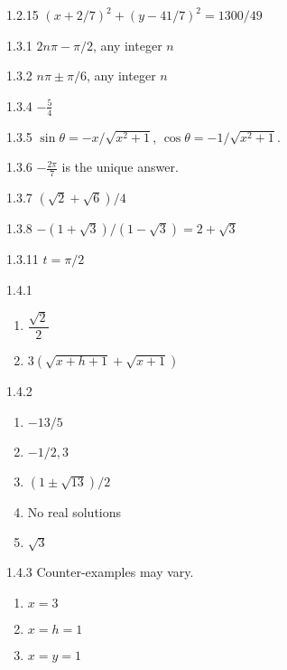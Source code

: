 \begin{Answer}{1.2.15}
$(x+2/7)^2+(y-41/7)^2=1300/49$
\end{Answer}
\begin{Answer}{1.3.1}
$2n\pi-\pi/2$, any integer $n$
\end{Answer}
\begin{Answer}{1.3.2}
$n\pi\pm\pi/6$, any integer $n$
\end{Answer}
\begin{Answer}{1.3.4}
$-\frac{5}{4}$
\end{Answer}
\begin{Answer}{1.3.5}
$\sin\theta=-x/\sqrt{x^{2}+1}$, $\cos\theta=-1/\sqrt{x^{2}+1}$.
\end{Answer}
\begin{Answer}{1.3.6}
$-\frac{2\pi}{7}$ is the unique answer.
\end{Answer}
\begin{Answer}{1.3.7}
$(\sqrt{2}+\sqrt{6})/4$
\end{Answer}
\begin{Answer}{1.3.8}
 $-(1+\sqrt3)/(1-\sqrt3)=2+\sqrt3$
\end{Answer}
\begin{Answer}{1.3.11}
 $t=\pi/2$
\end{Answer}
\begin{Answer}{1.4.1}
\begin{enumerate}
	\item	$\dfrac{\sqrt{2}}{2}$
	\item	$3(\sqrt{x+h+1}+\sqrt{x+1})$
\end{enumerate}
\end{Answer}
\begin{Answer}{1.4.2}
\begin{enumerate}
	\item	$-13/5$
	\item	$-1/2,3$
	\item	$(1\pm\sqrt{13})/2$
	\item	No real solutions
	\item	$\sqrt{3}$
\end{enumerate}
\end{Answer}
\begin{Answer}{1.4.3}
Counter-examples may vary.
\begin{enumerate}
	\item	$x=3$
	\item	$x=h=1$
	\item	$x=y=1$
\end{enumerate}
\end{Answer}
